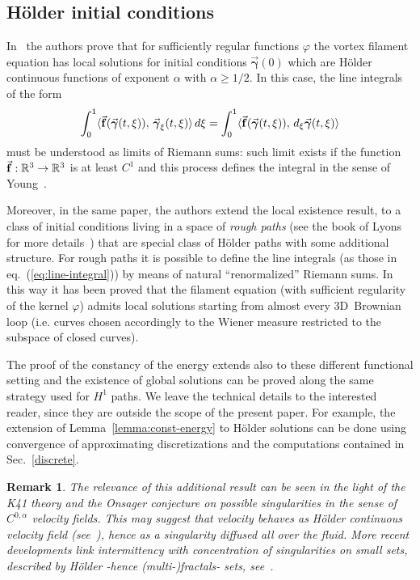 \documentclass[a4paper,11pt]{article}
\numberwithin{equation}{section}
\newtheorem{remark}{Remark}
\newcommand{\R}{\mathbb{R}}
\newcommand{\bgamma}{\mbox{$\vec{\boldsymbol \gamma}$}}
\begin{document}
\subsection{H\"older initial conditions}
%
In~\cite{BGR} the authors prove that for sufficiently regular
functions $\varphi$ the vortex filament equation has local solutions
for initial conditions $\bgamma(0)$ which are H\"older continuous
functions of exponent $\alpha$ with $\alpha \ge 1/2$. In this case,
the line integrals of the form
\begin{equation}
\label{eq:line-integral}
\int_0^1 \langle\vec{\bf
   f}(\bgamma(t,\xi)),\,\bgamma_\xi(t,\xi)\rangle\, d\xi= 
   \int_0^1 \langle\vec{\bf f}(\bgamma(t,\xi)),\,d_\xi
  \bgamma(t,\xi)\rangle 
\end{equation}
must be understood as limits of Riemann sums: such limit exists if the
function $\vec{\bf f}: \R^3 \to \R^3$ is at least $C^1$ and this
process defines the integral in the sense of Young~\cite{Young}.\par  
%
Moreover, in the same paper, the authors extend the local existence
result, to a class of initial conditions living in a space of
\emph{rough paths} (see the book of Lyons for more
details~\cite{Lyons,LyonsBook}) that are special class of H\"older paths
with some additional structure. For rough paths
it is possible to define the line integrals (as those in
eq.~(\ref{eq:line-integral})) by means of natural ``renormalized''
Riemann sums. In this way it has been proved that the filament
equation (with sufficient regularity of the kernel $\varphi$) admits
local solutions starting from almost every 3D~Brownian loop
(i.e. curves chosen accordingly to the Wiener measure restricted to
the subspace of closed curves).\par 
%
The proof of the constancy of the energy extends also to these
different functional setting and the existence of global solutions can
be proved along the same strategy used for $H^1$ paths. We leave the
technical details to the interested reader, since they are outside the
scope of the present paper. For example, the extension of Lemma~\ref{lemma:const-energy} to H\"older solutions can be done using convergence of approximating discretizations and the computations contained in Sec.~\ref{discrete}.\par
%
\begin{remark}
The relevance of this additional result can be seen in the light of
the K41 theory and the Onsager conjecture on possible singularities in
the sense of $C^{0,\alpha}$ velocity fields. This may suggest that
velocity behaves as H\"older continuous velocity field (see~\cite{f}),
hence as a singularity diffused all over the fluid. More recent
developments link intermittency with concentration of singularities
on small sets, described by H\"older -hence (multi-)fractals- sets,
see~\cite{f,g}.
\end{remark}
%
\end{document}
